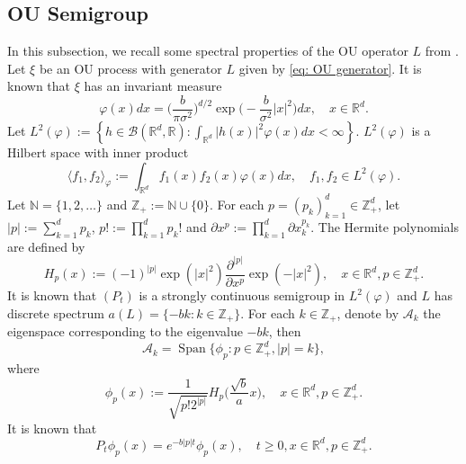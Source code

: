 \documentclass[12pt,a4paper]{amsart}
\theoremstyle{plain}
\theoremstyle{definition}
\numberwithin{equation}{section}
\begin{document}
\subsection{OU Semigroup}
   In this subsection, we recall 
   some spectral properties of the OU operator $L$ from \cite{GD}.
    Let $\xi$ be an OU process with generator $L$ given by \eqref{eq: OU generator}.
    It is known that $\xi$ has an invariant measure
\begin{equation}
\label{invariantdensity}
    \varphi(x)dx
    =\Big (\frac{b}{\pi \sigma^2}\Big )^{d/2}\exp \Big(-\frac{b}{\sigma^2}|x|^2 \Big)dx,
    \quad x\in \mathbb R^d.
\end{equation}
    Let $L^2(\varphi):= \left\{ h  \in \mathcal B(\mathbb R^d, \mathbb R): \int_{\mathbb R^d} |h(x)|^2 \varphi(x) dx < \infty \right\}$. $L^2(\varphi)$ is a Hilbert space with inner product
\begin{equation}
    \langle f_1, f_2 \rangle_{\varphi}
    := \int_{\mathbb R^d}f_1(x)f_2(x)\varphi(x) dx, \quad f_1,f_2 \in L^2(\varphi).
\end{equation}
     Let $\mathbb N = \{1,2,\dots\}$ and $\mathbb Z_+ := \mathbb N\cup\{0\}$.
     For each $p = (p_k)_{k = 1}^d \in \mathbb{Z}_+^{d}$,
    let $|p|:=\sum_{k=1}^d p_k$, $p!:= \prod_{k= 1}^d p_k !$ and $\partial x^p:= \prod_{k = 1}^d\partial x_k^{p_k}$.
    The Hermite polynomials are defined by
\begin{equation}
    H_p(x)
    :=(-1)^{|p|}\exp(|x|^2) \frac{\partial ^{|p|}}{\partial x^p} \exp(-|x|^2) ,
    \quad x\in \mathbb R^d,
    p \in \mathbb{Z}_+^{d}.
\end{equation}
    It is known that $(P_t)$ is a strongly continuous semigroup in $L^2(\varphi)$ and $L$ has
    discrete spectrum $a(L)= \{-bk: k \in \mathbb Z_+\}$.
    For each $k \in \mathbb Z_+$, denote by $\mathcal{A}_k$ the eigenspace corresponding to the eigenvalue $-bk$, then
\begin{equation}
    \mathcal{A}_k
    = \operatorname{Span} \{\phi_p : p\in \mathbb Z_+^d, |p|=k\},
\end{equation}
where
\begin{equation}\label{eigenfunction}
    \phi_p(x)
    := \frac{1}{\sqrt{ p! 2^{|p|} }} H_p \Big(\frac{ \sqrt{b} }{a}x \Big),
    \quad x\in \mathbb R^d, p\in \mathbb Z_+^d.
\end{equation}
    It is known that
\begin{equation}\label{semigroupformula}
    P_t\phi_p(x)
    =e^{-b|p|t}\phi_p(x),
    \quad t\geq 0, x\in \mathbb R^d, p\in \mathbb Z_+^d.
\end{equation}
\end{document}
